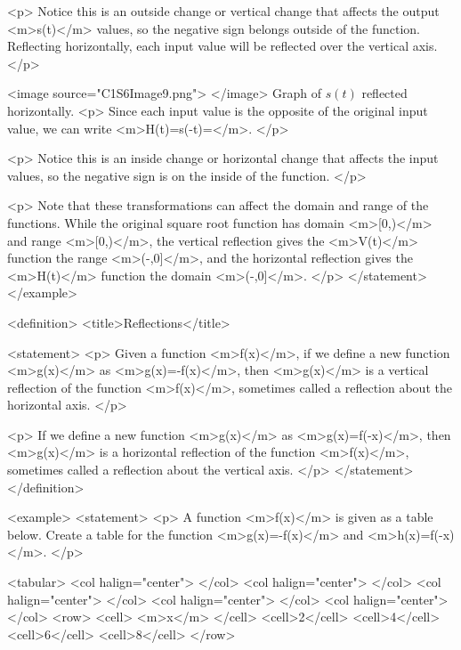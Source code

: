                 <p>
                    Notice this is an outside change or vertical change that affects the output <m>s(t)</m> values, so the negative sign belongs outside of the function.
                    Reflecting horizontally, each input value will be reflected over the vertical axis.
                </p>

                <image source="C1S6Image9.png">
                </image>
                Graph of $s(t)$ reflected horizontally.
                <p>
                    Since each input value is the opposite of the original input value, we can write <m>H(t)=s(-t)=</m>.
                </p>

                <p>
                    Notice this is an inside change or horizontal change that affects the input values, so the negative sign is on the inside of the function.
                </p>

                <p>
                    Note that these transformations can affect the domain and range of the functions.
                    While the original square root function has domain <m>[0,\infty)</m> and range <m>[0,\infty)</m>, the vertical reflection gives the <m>V(t)</m> function the range <m>(-\infty,0]</m>, and the horizontal reflection gives the <m>H(t)</m> function the domain <m>(-\infty,0]</m>.
                </p>
            </statement>
        </example>

        <definition>
            <title>Reflections</title>

            <statement>
                <p>
                    Given a function <m>f(x)</m>, if we define a new function <m>g(x)</m> as <m>g(x)=-f(x)</m>, then <m>g(x)</m> is a vertical reflection of the function <m>f(x)</m>, sometimes called a reflection about the horizontal axis.
                </p>

                <p>
                    If we define a new function <m>g(x)</m> as <m>g(x)=f(-x)</m>, then <m>g(x)</m> is a horizontal reflection of the function <m>f(x)</m>, sometimes called a reflection about the vertical axis.
                </p>
            </statement>
        </definition>

        <example>
            <statement>
                <p>
                    A function <m>f(x)</m> is given as a table below.
                    Create a table for the function <m>g(x)=-f(x)</m> and <m>h(x)=f(-x)</m>.
                </p>

                <tabular>
                    <col halign="center"> </col> <col halign="center"> </col> <col halign="center"> </col> <col halign="center"> </col> <col halign="center"> </col>
                    <row>
                        <cell> <m>x</m> </cell>
                        <cell>2</cell>
                        <cell>4</cell>
                        <cell>6</cell>
                        <cell>8</cell>
                    </row>

